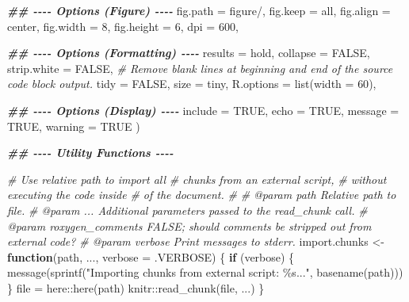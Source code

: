 \documentclass[
  11pt,
  a4paper,
]{scrartcl}
\newenvironment{Shaded}{\begin{snugshade}}{\end{snugshade}}
\newcommand{\AttributeTok}[1]{\textcolor[rgb]{0.77,0.63,0.00}{#1}}
\newcommand{\CommentTok}[1]{\textcolor[rgb]{0.56,0.35,0.01}{\textit{#1}}}
\newcommand{\ConstantTok}[1]{\textcolor[rgb]{0.00,0.00,0.00}{#1}}
\newcommand{\ControlFlowTok}[1]{\textcolor[rgb]{0.13,0.29,0.53}{\textbf{#1}}}
\newcommand{\DecValTok}[1]{\textcolor[rgb]{0.00,0.00,0.81}{#1}}
\newcommand{\DocumentationTok}[1]{\textcolor[rgb]{0.56,0.35,0.01}{\textbf{\textit{#1}}}}
\newcommand{\FunctionTok}[1]{\textcolor[rgb]{0.00,0.00,0.00}{#1}}
\newcommand{\NormalTok}[1]{#1}
\newcommand{\OtherTok}[1]{\textcolor[rgb]{0.56,0.35,0.01}{#1}}
\newcommand{\SpecialCharTok}[1]{\textcolor[rgb]{0.00,0.00,0.00}{#1}}
\newcommand{\StringTok}[1]{\textcolor[rgb]{0.31,0.60,0.02}{#1}}
\begin{document}
\begin{Shaded}
\begin{Highlighting}[]
  \DocumentationTok{\#\# {-}{-}{-}{-} Options (Figure) {-}{-}{-}{-}}
  \AttributeTok{fig.path    =} \StringTok{\textquotesingle{}figure/\textquotesingle{}}\NormalTok{,}
  \AttributeTok{fig.keep    =} \StringTok{\textquotesingle{}all\textquotesingle{}}\NormalTok{,}
  \AttributeTok{fig.align   =} \StringTok{\textquotesingle{}center\textquotesingle{}}\NormalTok{,}
  \AttributeTok{fig.width   =} \DecValTok{8}\NormalTok{,}
  \AttributeTok{fig.height  =} \DecValTok{6}\NormalTok{,}
  \AttributeTok{dpi         =} \DecValTok{600}\NormalTok{,}
  
  \DocumentationTok{\#\# {-}{-}{-}{-} Options (Formatting) {-}{-}{-}{-}}
  \AttributeTok{results     =} \StringTok{\textquotesingle{}hold\textquotesingle{}}\NormalTok{,}
  \AttributeTok{collapse    =} \ConstantTok{FALSE}\NormalTok{,}
  \AttributeTok{strip.white =} \ConstantTok{FALSE}\NormalTok{,  }\CommentTok{\# Remove blank lines at beginning and end of the source code block output.}
  \AttributeTok{tidy        =} \ConstantTok{FALSE}\NormalTok{,}
  \AttributeTok{size        =} \StringTok{\textquotesingle{}tiny\textquotesingle{}}\NormalTok{,}
  \AttributeTok{R.options   =} \FunctionTok{list}\NormalTok{(}\AttributeTok{width =} \DecValTok{60}\NormalTok{),}

  \DocumentationTok{\#\# {-}{-}{-}{-} Options (Display) {-}{-}{-}{-}}
  \AttributeTok{include     =} \ConstantTok{TRUE}\NormalTok{,}
  \AttributeTok{echo        =} \ConstantTok{TRUE}\NormalTok{,   }
  \AttributeTok{message     =} \ConstantTok{TRUE}\NormalTok{,}
  \AttributeTok{warning     =} \ConstantTok{TRUE}
\NormalTok{)}

\DocumentationTok{\#\# {-}{-}{-}{-} Utility Functions {-}{-}{-}{-}}

\CommentTok{\#\textquotesingle{} Use relative path to import all}
\CommentTok{\#\textquotesingle{} chunks from an external script,}
\CommentTok{\#\textquotesingle{} without executing the code inside}
\CommentTok{\#\textquotesingle{} of the document.}
\CommentTok{\#\textquotesingle{}}
\CommentTok{\#\textquotesingle{} @param path Relative path to file.}
\CommentTok{\#\textquotesingle{} @param ... Additional parameters passed to the \textasciigrave{}read\_chunk\textasciigrave{} call.}
\CommentTok{\#\textquotesingle{} @param roxygen\_comments FALSE; should comments be stripped out from external code?}
\CommentTok{\#\textquotesingle{} @param verbose Print messages to stderr.}
\NormalTok{import.chunks }\OtherTok{\textless{}{-}} \ControlFlowTok{function}\NormalTok{(path, ..., }\AttributeTok{verbose =}\NormalTok{ .VERBOSE) \{}
  \ControlFlowTok{if}\NormalTok{ (verbose) \{ }\FunctionTok{message}\NormalTok{(}\FunctionTok{sprintf}\NormalTok{(}\StringTok{"Importing chunks from external script: \textquotesingle{}\%s\textquotesingle{}..."}\NormalTok{, }\FunctionTok{basename}\NormalTok{(path))) \}}
\NormalTok{  file }\OtherTok{=}\NormalTok{ here}\SpecialCharTok{::}\FunctionTok{here}\NormalTok{(path)}
\NormalTok{  knitr}\SpecialCharTok{::}\FunctionTok{read\_chunk}\NormalTok{(file, ...)}
\NormalTok{\}}


\end{Highlighting}
\end{Shaded}
\end{document}
